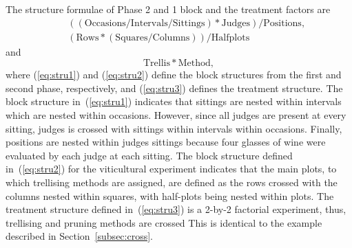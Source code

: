 \documentclass[article]{jss}
\begin{document}
The structure formulae of Phase 2 and 1 block and the treatment factors are
\begin{eqnarray}
\label{eq:stru1}&&\mathrm{((Occasions/Intervals/Sittings)*Judges)/Positions,}\\
\label{eq:stru2}&&\mathrm{(Rows*(Squares/Columns))/Halfplots}
\end{eqnarray}
and
\begin{equation}\label{eq:stru3}
\mathrm{Trellis*Method,}
\end{equation}
where (\ref{eq:stru1}) and (\ref{eq:stru2}) define the block structures from the first and second phase, respectively, and (\ref{eq:stru3}) defines the treatment structure. The block structure in~(\ref{eq:stru1}) indicates that sittings are nested within intervals which are nested within occasions. However, since all judges are present at every sitting, judges is crossed with sittings within intervals within occasions. Finally, positions are nested within judges sittings because four glasses of wine were evaluated by each judge at each sitting. The block structure defined in~(\ref{eq:stru2}) for the viticultural experiment indicates that the main plots, to which trellising methods are assigned, are defined as the rows crossed with the columns nested within squares, with half-plots being nested within plots. The treatment structure defined in~(\ref{eq:stru3}) is a 2-by-2 factorial experiment, thus, trellising and pruning methods are crossed This is identical to the example described in Section~\ref{subsec:cross}.
\end{document}
